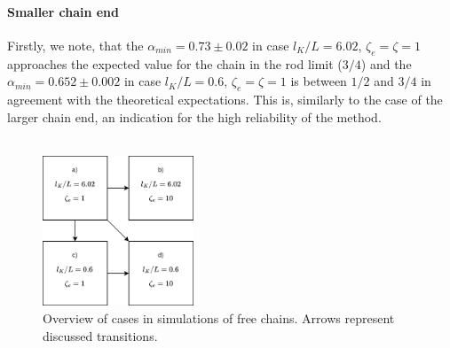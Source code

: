 \documentclass[
    paper=A4,pagesize=automedia,fontsize=12pt,
    BCOR=15mm,DIV=22,
    twoside,headinclude,footinclude=false,
    fleqn,             %
    bibliography=totocnumbered,          %
    listof=totoc,                %
    listof=flat,                 %
    cleardoublepage=empty      %
    numbers=endperiod
]{scrartcl}
\begin{document}
\paragraph{Smaller chain end}
Firstly, we note, that the $\alpha_{min} = 0.73 \pm 0.02$
in case $l_K/L=6.02$, $\zeta_e=\zeta=1$ approaches the expected value for 
the chain in the rod limit ($3/4$) and the $\alpha_{min} = 0.652 \pm 0.002$ in case
$l_K/L=0.6$, $\zeta_e=\zeta=1$ is between $1/2$ and $3/4$ in agreement with the 
theoretical expectations. This is, similarly to the case of the larger chain end, 
an indication for the high reliability of the method.
\\
\\
\begin{figure}[H]
    \centering
    \includegraphics[width=0.4\textwidth]{cases_diag.png}
    \caption{
        Overview of cases in simulations of free chains.
        Arrows represent discussed transitions.
    }
    \label{fig:alpha_cases_diag}
\end{figure}
\end{document}
